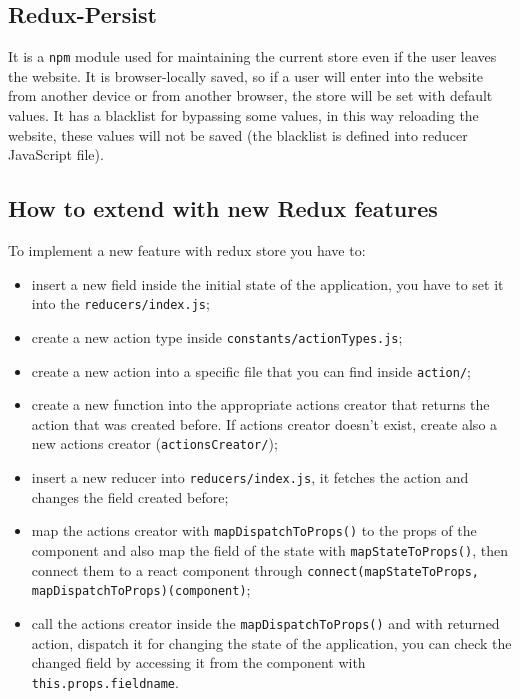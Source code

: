 \subsection{Redux-Persist}
It is a \texttt{npm} module used for maintaining the current store even if the user leaves the website. It is browser-locally saved, so if a user will enter into the website from another device or from another browser, the store will be set with default values. It has a blacklist for bypassing some values, in this way reloading the website, these values will not be saved (the blacklist is defined into reducer JavaScript file).

\subsection{How to extend with new Redux features}
To implement a new feature with redux store you have to:
\begin{itemize}
	\item insert a new field inside the initial state of the application, you have to set it into the \texttt{reducers/index.js};
	\item create a new action type inside \texttt{constants/actionTypes.js};
	\item create a new action into a specific file that you can find inside \texttt{action/};
	\item create a new function into the appropriate actions creator that returns the action that was created before. If actions creator doesn't exist, create also a new actions creator (\texttt{actionsCreator/});
	\item insert a new reducer into \texttt{reducers/index.js}, it fetches the action and changes the field created before;
	\item map the actions creator with \texttt{mapDispatchToProps()} to the props of the component and also map the field of the state with \texttt{mapStateToProps()}, then connect them to a react component through \texttt{connect(mapStateToProps, mapDispatchToProps)(component)};
	\item call the actions creator inside the \texttt{mapDispatchToProps()} and with returned action, dispatch it for changing the state of the application, you can check the changed field by accessing it from the component with \texttt{this.props.fieldname}. 
\end{itemize}

